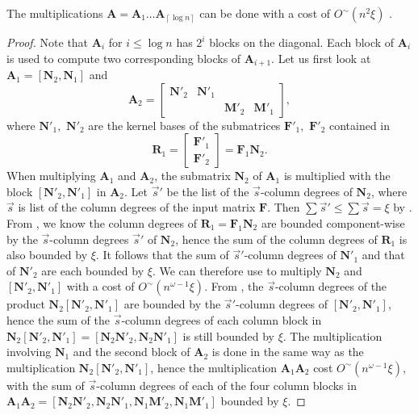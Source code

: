 \begin{lem}
The multiplications $\mathbf{A}=\mathbf{A}_{1}\dots\mathbf{A}_{\left\lceil \log n\right\rceil }$
can be done with a cost of $O^{\sim}(n^{2}\xi)$ .\end{lem}
\begin{proof}
Note that $\mathbf{A}_{i}$ for $i\le\log n$ has $2^{i}$ blocks
on the diagonal. Each block of $\mathbf{A}_{i}$ is used to compute
two corresponding blocks of $\mathbf{A}_{i+1}$. Let us first look
at $\mathbf{A}_{1}=\left[\mathbf{N}_{2},\mathbf{N}_{1}\right]$ and
\[
\mathbf{A}_{2}=\begin{bmatrix}\mathbf{N}'_{2} & \mathbf{N}'_{1}\\
 &  & \mathbf{M}'_{2} & \mathbf{M}'_{1}
\end{bmatrix},
\]
 where $\mathbf{N}'_{1},$ $\mathbf{N}'_{2}$ are the kernel bases
of the submatrices $\mathbf{F}'_{1},$ $\mathbf{F}'_{2}$ contained
in 
\[
\mathbf{R}_{1}=\begin{bmatrix}\mathbf{F}'_{1}\\
\mathbf{F}'_{2}
\end{bmatrix}=\mathbf{F}_{1}\mathbf{N}_{2}.
\]
 When multiplying $\mathbf{A}_{1}$ and $\mathbf{A}_{2}$, the submatrix
$\mathbf{N}_{2}$ of $\mathbf{A}_{1}$ is multiplied with the block
$\left[\mathbf{N}'_{2},\mathbf{N}'_{1}\right]$ in $\mathbf{A}_{2}$.
Let $\vec{s}'$ be the list of the $\vec{s}$-column degrees of $\mathbf{N}_{2}$,
where $\vec{s}$ is list of the column degrees of the input matrix
$\mathbf{F}$. Then $\sum\vec{s}'\le\sum\vec{s}=\xi$ by .
From , we know the column degrees
of $\mathbf{R}_{1}=\mathbf{F}_{1}\mathbf{N}_{2}$ are bounded component-wise
by the $\vec{s}$-column degrees $\vec{s}'$ of $\mathbf{N}_{2}$,
hence the sum of the column degrees of $\mathbf{R}_{1}$ is also bounded
by $\xi$. It follows that the sum of $\vec{s}'$-column degrees of
$\mathbf{N}'_{1}$ and that of $\mathbf{N}'_{2}$ are each bounded
by $\xi$. We can therefore use 
to multiply $\mathbf{N}_{2}$ and $\left[\mathbf{N}'_{2},\mathbf{N}'_{1}\right]$
with a cost of $O^{\sim}\left(n^{\omega-1}\xi\right)$. From ,
the $\vec{s}$-column degrees of the product $\mathbf{N}_{2}\left[\mathbf{N}'_{2},\mathbf{N}'_{1}\right]$
are bounded by the $\vec{s}'$-column degrees of $\left[\mathbf{N}'_{2},\mathbf{N}'_{1}\right]$,
hence the sum of the $\vec{s}$-column degrees of each column block
in $\mathbf{N}_{2}\left[\mathbf{N}'_{2},\mathbf{N}'_{1}\right]=\left[\mathbf{N}_{2}\mathbf{N}'_{2},\mathbf{N}_{2}\mathbf{N}'_{1}\right]$
is still bounded by $\xi$. The multiplication involving $\mathbf{N}_{1}$
and the second block of $\mathbf{A}_{2}$ is done in the same way
as the multiplication $\mathbf{N}_{2}\left[\mathbf{N}'_{2},\mathbf{N}'_{1}\right]$,
hence the multiplication $\mathbf{A}_{1}\mathbf{A}_{2}$ cost $O^{\sim}\left(n^{\omega-1}\xi\right)$,
with the sum of $\vec{s}$-column degrees of each of the four column
blocks in $\mathbf{A}_{1}\mathbf{A}_{2}=\left[\mathbf{N}_{2}\mathbf{N}'_{2},\mathbf{N}_{2}\mathbf{N}'_{1},\mathbf{N}_{1}\mathbf{M}'_{2},\mathbf{N}_{1}\mathbf{M}'_{1}\right]$
bounded by $\xi$.


\end{proof}
